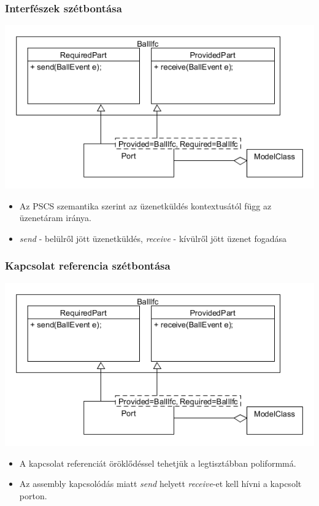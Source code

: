 \documentclass[11pt]{beamer}
\begin{document}
\begin{frame}
	\frametitle{Interfészek szétbontása}
	\begin{center}
	\includegraphics[scale=0.5]{vedes_demo_interface_send_rec.png}
	\end{center}
	\begin{itemize}
	\item Az PSCS szemantika szerint az üzenetküldés kontextusától függ az üzenetáram iránya.
	\item \textit{send} - belülről jött üzenetküldés, \textit{receive} - kívülről jött üzenet fogadása
	\end{itemize}
\end{frame}

\begin{frame}
	\frametitle{Kapcsolat referencia szétbontása}
	\begin{center}
	\includegraphics[scale=0.5]{vedes_demo_interface_send_rec.png}
	\end{center}
	\begin{itemize}
	\item A kapcsolat referenciát öröklődéssel tehetjük a legtisztábban poliformmá.
	\item Az assembly kapcsolódás miatt \textit{send} helyett \textit{receive}-et kell hívni a kapcsolt porton.
	\end{itemize}
\end{frame}
\end{document}
